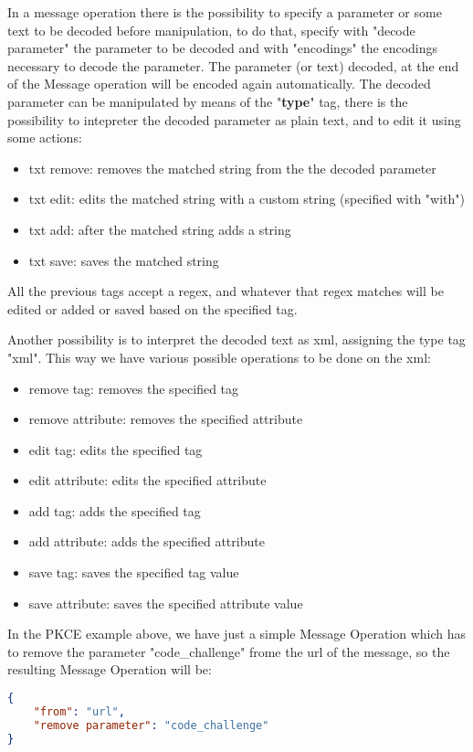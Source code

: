 In a message operation there is the possibility to specify a parameter or some text to be decoded before manipulation, to do that, specify with "decode parameter" the parameter to be decoded and with "encodings" the encodings necessary to decode the parameter. The parameter (or text) decoded, at the end of the Message operation will be encoded again automatically.
The decoded parameter can be manipulated by means of the "\textbf{type}" tag, there is the possibility to intepreter the decoded parameter as plain text, and to edit it using some actions:
\begin{itemize}
    \item txt remove: removes the matched string from the the decoded parameter
    \item txt edit: edits the matched string with a custom string (specified with "with")
    \item txt add: after the matched string adds a string
    \item txt save: saves the matched string
\end{itemize}
All the previous tags accept a regex, and whatever that regex matches will be edited or added or saved based on the specified tag.

Another possibility is to interpret the decoded text as xml, assigning the type tag "xml".
This way we have various possible operations to be done on the xml:
\begin{itemize}
    \item remove tag: removes the specified tag
    \item remove attribute: removes the specified attribute
    \item edit tag: edits the specified tag
    \item edit attribute: edits the specified attribute
    \item add tag: adds the specified tag
    \item add attribute: adds the specified attribute
    \item save tag: saves the specified tag value
    \item save attribute: saves the specified attribute value
\end{itemize}

In the PKCE example above, we have just a simple Message Operation which has to remove the parameter "code\_challenge" frome the url of the message, so the resulting Message Operation will be:
\begin{lstlisting}[language=json]
{
    "from": "url",
    "remove parameter": "code_challenge"
}
\end{lstlisting}

